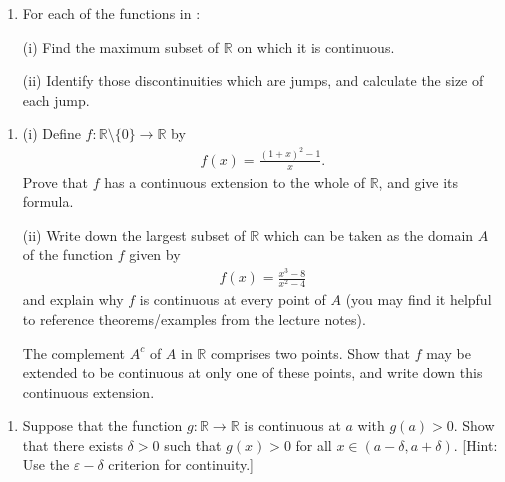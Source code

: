 \documentclass[letterpaper,10pt,english]{jupyterBook}
\begin{document}
\label{\detokenize{Problems:id17}}\begin{enumerate}
%
\setcounter{enumi}{16}
\item {} 
\sphinxAtStartPar
For each of the functions in {\hyperref[\detokenize{Problems:id8}]{}}:

\sphinxAtStartPar
(i) Find the maximum subset of \(\mathbb{R}\) on which it is continuous.

\sphinxAtStartPar
(ii) Identify those discontinuities which are jumps, and calculate the size of each jump.

\end{enumerate}
\label{\detokenize{Problems:id18}}\begin{enumerate}
%
\setcounter{enumi}{17}
\item {} 
\sphinxAtStartPar
{}

\sphinxAtStartPar
(i) Define \(f:\mathbb{R} \setminus \{0\} \rightarrow \mathbb{R}\) by
\begin{equation*}
\begin{split}
    f(x) = \displaystyle\frac{(1 + x)^{2} - 1}{x}.
    \end{split}
\end{equation*}
\sphinxAtStartPar
Prove that \(f\) has a continuous extension to the whole of \(\mathbb{R}\), and give its formula.

\sphinxAtStartPar
(ii) Write down the largest subset of \(\mathbb{R}\) which can be taken as the domain \(A\) of the function \(f\) given by
\begin{equation*}
\begin{split}
    f(x) = \displaystyle\frac{x^{3}-8}{x^{2} - 4}
    \end{split}
\end{equation*}
\sphinxAtStartPar
and explain why \(f\) is continuous at every point of \(A\) (you may find it helpful to reference theorems/examples from the lecture notes).

\sphinxAtStartPar
The complement \(A^{c}\) of \(A\) in \(\mathbb{R}\) comprises two points. Show that \(f\) may be extended to be continuous at only one of these points, and write down this continuous extension.

\end{enumerate}
\label{\detokenize{Problems:id19}}\begin{enumerate}
%
\setcounter{enumi}{18}
\item {} 
\sphinxAtStartPar
{} Suppose that the function \(g: \mathbb{R} \rightarrow \mathbb{R}\) is continuous at \(a\) with \(g(a) > 0\). Show that there exists \(\delta > 0\) such that \(g(x) > 0\)  for all \( x \in (a - \delta, a + \delta)\). {[}Hint: Use the \(\varepsilon-\delta\) criterion for continuity.{]}

\end{enumerate}
\end{document}
